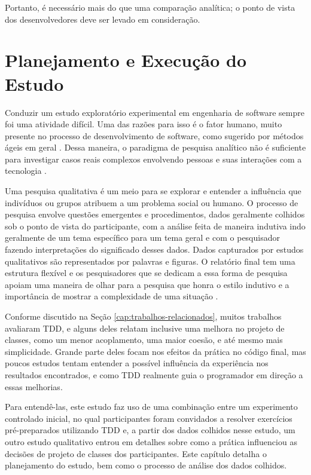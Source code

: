\documentclass[conference]{IEEEtran}
\begin{document}
Portanto, é necessário mais do que uma comparação analítica; o
ponto de vista dos desenvolvedores deve ser levado em consideração.

\section{Planejamento e Execução do Estudo} 
\label{sec:planejamento}

Conduzir um estudo exploratório experimental em engenharia de software sempre foi uma
atividade difícil. Uma das razões para isso é o fator humano, muito presente 
no processo de desenvolvimento de software, como sugerido por métodos ágeis  em
geral \cite{AgileManifesto}. Dessa maneira, o paradigma de pesquisa analítico 
não é suficiente para investigar casos reais complexos envolvendo pessoas e 
suas interações com a tecnologia \cite{guidelines-case-study}.

Uma pesquisa qualitativa é um meio para se explorar e entender a influência que 
indivíduos ou grupos atribuem a um problema social ou humano. O processo de
pesquisa envolve questões emergentes e procedimentos, dados geralmente colhidos
sob o ponto de vista do participante, com a análise feita de maneira indutiva
indo geralmente de um tema específico para um tema geral e com o pesquisador
fazendo interpretações do significado desses dados. Dados capturados por estudos
qualitativos são representados por palavras e figuras.
O relatório final tem uma estrutura flexível e os pesquisadores que se
dedicam a essa forma de pesquisa apoiam uma maneira de olhar para a pesquisa que
honra o estilo indutivo e a importância de mostrar a 
complexidade de uma situação \cite{creswell}.

Conforme discutido na Seção \ref{cap:trabalhos-relacionados}, muitos 
trabalhos avaliaram TDD, e alguns deles relatam inclusive uma melhora
no projeto de classes, como um menor acoplamento, uma maior coesão, e até mesmo
mais simplicidade. 
Grande parte deles focam nos efeitos da prática no código final, mas poucos 
estudos tentam entender a possível influência da experiência
nos resultados encontrados, e como TDD realmente guia o programador 
em direção a essas melhorias.

Para entendê-las, este estudo faz uso de uma combinação entre um experimento 
controlado inicial, no qual participantes foram convidados a resolver exercícios 
pré-preparados utilizando TDD e, a partir dos dados colhidos nesse estudo, um outro
estudo qualitativo entrou em detalhes sobre como a prática influenciou as decisões de 
projeto de classes dos participantes. Este capítulo detalha o planejamento do estudo, 
bem como o processo de análise dos dados colhidos.
\end{document}
